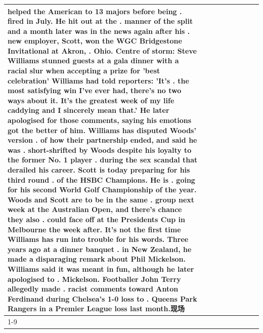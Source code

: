 \begin{table}[H]
\begin{tabular}{lllrlllll}
helped the American to 13 majors before being . fired in July. He hit out at the . manner of the split and a month later was in the news again after his . new employer, Scott, won the WGC Bridgestone Invitational at Akron, . Ohio. Centre of storm: Steve Williams stunned guests at a gala dinner with a racial slur when accepting a prize for 'best celebration' Williams had told reporters: 'It's . the most satisfying win I've ever had, there's no two ways about it. It's the greatest week of my life caddying and I sincerely mean that.' He later apologised for those comments, saying his emotions got the better of him. Williams has disputed Woods' version . of how their partnership ended, and said he was . short-shrifted by Woods despite his loyalty to the former No. 1 player . during the sex scandal that derailed his career. Scott is today preparing for his third round . of the HSBC Champions. He is . going for his second World Golf Championship of the year. Woods and Scott are to be in the same . group next week at the Australian Open, and there's chance they also . could face off at the Presidents Cup in Melbourne the week after. It's not the first time Williams has run into trouble for his words. Three years ago at a dinner banquet . in New Zealand, he made a disparaging remark about Phil Mickelson. Williams said it was meant in fun, although he later apologised to . Mickelson. Footballer John Terry allegedly made . racist comments toward Anton Ferdinand during Chelsea's 1-0 loss to . Queens Park Rangers in a Premier League loss last month.现场 \\
\cline{1-9}

\end{tabular}
\end{table}
